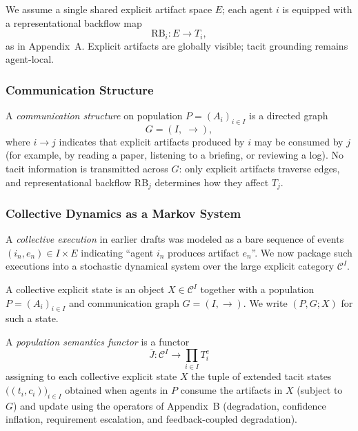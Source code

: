 We assume a single shared explicit artifact space $E$; each agent $i$ is
equipped with a representational backflow map
\[
  \mathrm{RB}_i : E \to T_i,
\]
as in Appendix~A. Explicit artifacts are globally visible; tacit grounding
remains agent-local.

\subsubsection{Communication Structure}

\begin{definition}
A \emph{communication structure} on population $P = (A_i)_{i \in I}$ is a
directed graph
\[
  G = (I,\;\to),
\]
where $i \to j$ indicates that explicit artifacts produced by $i$ may be
consumed by $j$ (for example, by reading a paper, listening to a briefing, or
reviewing a log). No tacit information is transmitted across $G$:
only explicit artifacts traverse edges, and representational backflow
$\mathrm{RB}_j$ determines how they affect $T_j$.
\end{definition}

\subsubsection{Collective Dynamics as a Markov System}

A \emph{collective execution} in earlier drafts was modeled as a bare
sequence of events $(i_n,e_n) \in I \times E$ indicating ``agent $i_n$
produces artifact $e_n$''. We now package such executions into a stochastic
dynamical system over the large explicit category $\mathcal{C}^I$.

\begin{definition}
A collective explicit state is an object $X \in \mathcal{C}^I$ together with
a population $P = (A_i)_{i\in I}$ and communication graph $G=(I,\to)$.
We write $(P,G;X)$ for such a state.
\end{definition}

\begin{definition}
A \emph{population semantics functor} is a functor
\[
  \overline{J} : \mathcal{C}^I \to \prod_{i\in I} T^e_i
\]
assigning to each collective explicit state $X$ the tuple of extended tacit
states $\bigl((t_i,c_i)\bigr)_{i\in I}$ obtained when agents in $P$ consume
the artifacts in $X$ (subject to $G$) and update using the operators of
Appendix~B (degradation, confidence inflation, requirement escalation, and
feedback-coupled degradation).
\end{definition}

